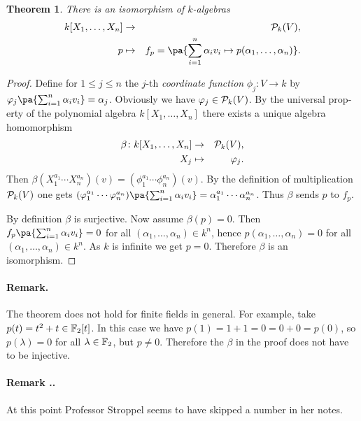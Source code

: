 \documentclass[12pt,a4paper]{scrartcl}
\theoremstyle{cplain}
\theoremstyle{cplain}
\newtheorem{thm}[thmcounter]{Theorem}
\theoremstyle{cplain}
\theoremstyle{definition}
\begin{document}
\begin{otherlanguage}{english}
\begin{thm} \label{thm:III.17}
  There is an isomorphism of $k$-algebras
  \begin{eqnarray*}
    k[X_1,\ldots,X_n] &\to& \Ps_k(V), \\
    p &\mapsto& f_p = \pa{ \sum_{i=1}^n\alpha_iv_i \mapsto p(\alpha_1,\ldots,\alpha_n)}.
  \end{eqnarray*}
\end{thm}
\begin{proof}
  Define for $1\le j \le n$ the $j$-th \emph{coordinate function} $\phi_j\colon V \to k$ by $\phi_j\pa{\sum_{i=1}^n\alpha_iv_i} = \alpha_j$. Obviously we have $\varphi_j \in \mathcal{P}_k(V)$. By the universal property of the polynomial algebra $k[X_1,\ldots,X_n]$ there exists a unique algebra homomorphism
  \begin{eqnarray*}
    \beta\colon k[X_1,\ldots,X_n] &\to& \mathcal{P}_k(V), \\
    X_j &\mapsto& \varphi_j.
  \end{eqnarray*}
  Then $\beta(X_1^{a_1}\cdots X_n^{a_n})(v) = (\phi_1^{a_1}\cdots\phi_n^{a_n})(v)$. By the definition of multiplication $\mathcal{P}_k(V)$ one gets $(\phi_1^{a_1}\cdots\phi_n^{a_n})\pa{\sum_{i=1}^n\alpha_iv_i} = \alpha_1^{a_1}\cdots\alpha_n^{a_n}$. Thus $\beta$ sends $p$ to $f_p$.

  By definition $\beta $ is surjective. Now assume $\beta(p) = 0$. Then $f_p\pa{\sum_{i=1}^n\alpha_iv_i} = 0$ for all $(\alpha_1,\ldots,\alpha_n)\in k^n$, hence $p(\alpha_1,\ldots,\alpha_n) = 0$ for all $(\alpha_1,\ldots,\alpha_n) \in k^n$. As $k$ is infinite we get $p=0$. Therefore $\beta$ is an isomorphism.
\end{proof}

\paragraph{Remark.}
The theorem does not hold for finite fields in general. For example, take $p(t) = t^2+t \in \mathbb F_2[t]$. In this case we have $p(1) = 1+1 = 0 = 0+0 = p(0)$, so $p(\lambda) = 0$ for all $\lambda\in\mathbb F_2$, but $p\neq 0$. Therefore the $\beta$ in the proof does not have to be injective.

\addtocounter{thmcounter}{1}
\paragraph{Remark ..}
At this point Professor Stroppel seems to have skipped a number in her notes.


\end{otherlanguage}
\end{document}
